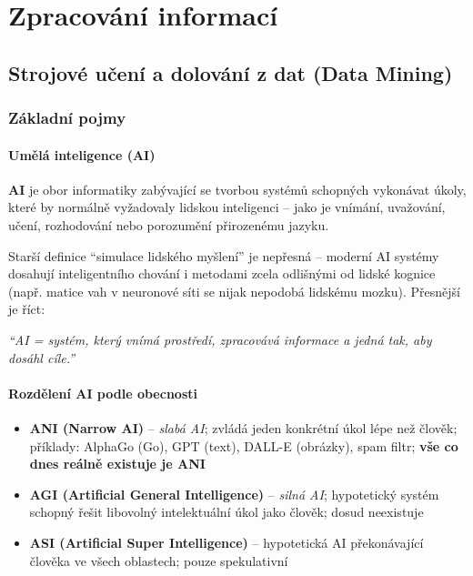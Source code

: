 \section{Zpracování informací}

\subsection{Strojové učení a dolování z dat (Data Mining)}

\subsubsection{Základní pojmy}

\paragraph{Umělá inteligence (AI)}

\textbf{AI} je obor informatiky zabývající se tvorbou systémů schopných vykonávat úkoly,
které by normálně vyžadovaly lidskou inteligenci -- jako je vnímání, uvažování, učení,
rozhodování nebo porozumění přirozenému jazyku.

Starší definice ``simulace lidského myšlení'' je nepřesná -- moderní AI systémy dosahují
inteligentního chování i metodami zcela odlišnými od lidské kognice (např. matice vah v
neuronové síti se nijak nepodobá lidskému mozku). Přesnější je říct:

\begin{center}\itshape
``AI = systém, který vnímá prostředí, zpracovává informace a jedná tak, aby dosáhl cíle.''
\end{center}

\paragraph{Rozdělení AI podle obecnosti}
\begin{itemize}
  \item \textbf{ANI (Narrow AI)} -- \textit{slabá AI}; zvládá jeden konkrétní úkol lépe než člověk;
    příklady: AlphaGo (Go), GPT (text), DALL-E (obrázky), spam filtr;
    \textbf{vše co dnes reálně existuje je ANI}
  \item \textbf{AGI (Artificial General Intelligence)} -- \textit{silná AI}; hypotetický systém
    schopný řešit libovolný intelektuální úkol jako člověk; dosud neexistuje
  \item \textbf{ASI (Artificial Super Intelligence)} -- hypotetická AI překonávající člověka ve
    všech oblastech; pouze spekulativní
\end{itemize}

